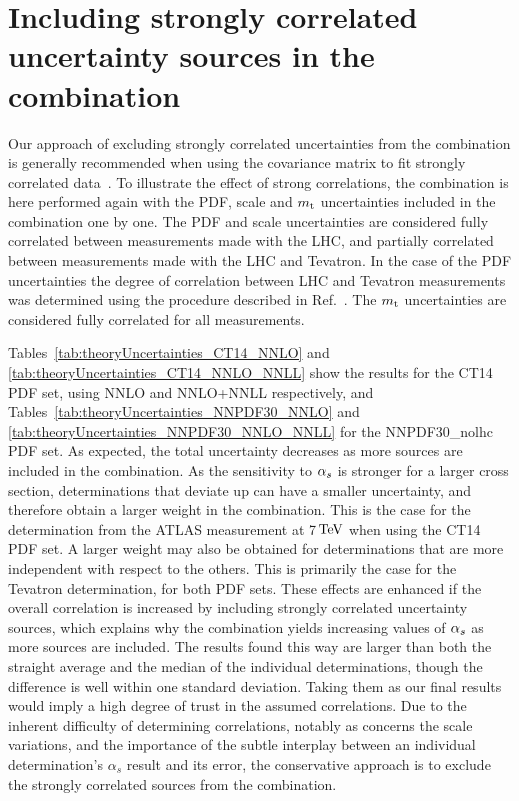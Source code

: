 \section{Including strongly correlated uncertainty sources in the combination}
\label{sec:appendix}

Our approach of excluding strongly correlated uncertainties from the combination is generally recommended when using the covariance matrix to fit strongly correlated data~\cite{DAgostini:1993arp}.
% 
To illustrate the effect of strong correlations, the combination is here performed again with the PDF, scale and $m_\mathrm{t}$ uncertainties included in the combination one by one.
% 
The PDF and scale uncertainties are considered fully correlated between measurements made with the LHC, and partially correlated between measurements made with the LHC and Tevatron.
% 
In the case of the PDF uncertainties the degree of correlation between LHC and Tevatron measurements was determined using the procedure described in Ref.~\cite{Buckley:2014ana}.
%
The $m_\mathrm{t}$ uncertainties are considered fully correlated for all measurements.
% 

Tables~\ref{tab:theoryUncertainties_CT14_NNLO} and \ref{tab:theoryUncertainties_CT14_NNLO_NNLL} show the results for the CT14 PDF set, using NNLO and NNLO+NNLL respectively, and Tables~\ref{tab:theoryUncertainties_NNPDF30_NNLO} and \ref{tab:theoryUncertainties_NNPDF30_NNLO_NNLL} for the NNPDF30\_nolhc PDF set.
% 
As expected, the total uncertainty decreases as more sources are included in the combination.
% 
As the sensitivity to $\alpha_s$ is stronger for a larger cross section, determinations that deviate up can have a smaller uncertainty, and therefore obtain a larger weight in the combination.
% 
This is the case for the determination from the ATLAS measurement at 7$\,\text{TeV}$ when using the CT14 PDF set.
% 
A larger weight may also be obtained for determinations that are more independent with respect to the others. This is primarily the case for the Tevatron determination, for both PDF sets.
% 
These effects are enhanced if the overall correlation is increased by including strongly correlated uncertainty sources, which explains why the combination yields increasing values of $\alpha_s$ as more sources are included.
% 
The results found this way are larger than both the straight average and the median of the individual determinations, though the difference is well within one standard deviation. 
% 
Taking them as our final results would imply a high degree of trust in the assumed correlations.
% 
Due to the inherent difficulty of determining correlations, notably as concerns the scale variations, and the importance of the subtle interplay between an individual determination's $\alpha_s$ result and its error, the conservative approach is to exclude the strongly correlated sources from the combination.
%

